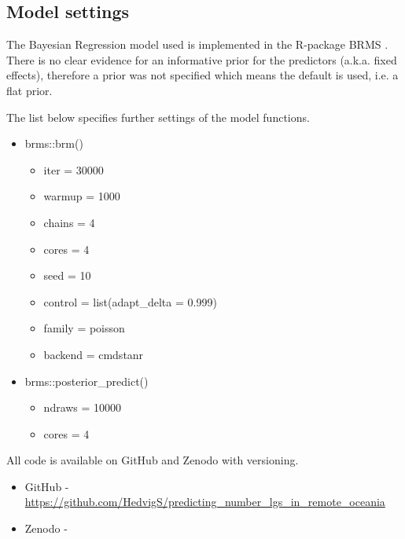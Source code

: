 \documentclass[unnumsec,webpdf,modern,medium]{oup-authoring-template}
\begin{document}
\subsection{Model settings}
\label{appendix_model_settings}
The Bayesian Regression model used is implemented in the R-package BRMS \citep{burkner2017brms}. There is no clear evidence for an informative prior for the predictors (a.k.a. fixed effects), therefore a prior was not specified which means the default is used, i.e. a flat prior.

The list below specifies further settings of the model functions.

\begin{itemize}
    \item brms::brm()
    \begin{itemize}
    \item  iter = 30000
    \item  warmup = 1000
    \item  chains = 4
    \item  cores = 4
    \item  seed = 10
    \item  control = list(adapt\_delta = 0.999)
    \item family = poisson
    \item backend = cmdstanr
    \end{itemize}
    \item brms::posterior\_predict()
    \begin{itemize}
    \item  ndraws = 10000
    \item  cores = 4
    \end{itemize}
\end{itemize}

All code is available on GitHub and Zenodo with versioning.

\begin{itemize}
    \item GitHub - \url{https://github.com/HedvigS/predicting_number_lgs_in_remote_oceania}
    \item Zenodo - 
\end{itemize}




\end{document}
